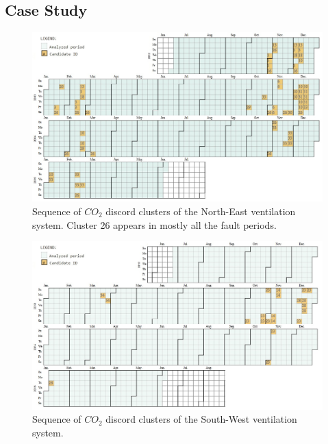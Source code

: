 \begin{landscape}
\leavevmode
\newline

\subsection{Case Study}
\begin{figure}[h!]
  \vspace{0.5em} %
  \includegraphics[scale=0.8]{Figures/Fault_id_candidate.jpg}
  \caption{Sequence of $CO_2$ discord clusters of the North-East ventilation system. Cluster 26 appears in mostly all the fault periods. }
  \label{fig:sequence_candidates}
\end{figure}

\begin{figure}[h!]
  \vspace{0.5em} %
  \includegraphics[scale=0.87]{Figures/Fault_id_candidate_SW.jpg}
  \caption{Sequence of $CO_2$ discord clusters of the South-West ventilation system. }
  \label{fig:sequence_candidates_SW}
\end{figure}

\end{landscape}
\restoregeometry

